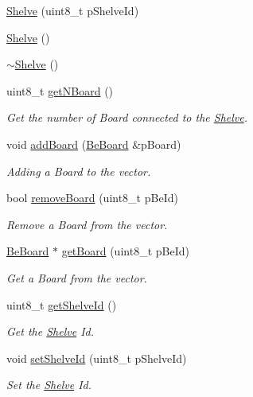 \begin{DoxyCompactItemize}
\item 
\hyperlink{class_ph2___hw_description_1_1_shelve_a7e0361665ca7e4de8ce3fd1138ad1d86}{Shelve} (uint8\-\_\-t p\-Shelve\-Id)
\item 
\hyperlink{class_ph2___hw_description_1_1_shelve_ab989c28364f9f94029dd02b3eb1d8241}{Shelve} ()
\item 
\hyperlink{class_ph2___hw_description_1_1_shelve_acbdc580d3ff8f4efe2df84d19ef6ef55}{$\sim$\-Shelve} ()
\item 
uint8\-\_\-t \hyperlink{class_ph2___hw_description_1_1_shelve_a9d8f1abe782fb206e11aae187cbc44c2}{get\-N\-Board} ()
\begin{DoxyCompactList}\small\item\em Get the number of Board connected to the \hyperlink{class_ph2___hw_description_1_1_shelve}{Shelve}. \end{DoxyCompactList}\item 
void \hyperlink{class_ph2___hw_description_1_1_shelve_aa6ab700f126822c6da156760f130aba6}{add\-Board} (\hyperlink{class_ph2___hw_description_1_1_be_board}{Be\-Board} \&p\-Board)
\begin{DoxyCompactList}\small\item\em Adding a Board to the vector. \end{DoxyCompactList}\item 
bool \hyperlink{class_ph2___hw_description_1_1_shelve_ad0d5bb55bdf8e6629cdc919685ffb8f9}{remove\-Board} (uint8\-\_\-t p\-Be\-Id)
\begin{DoxyCompactList}\small\item\em Remove a Board from the vector. \end{DoxyCompactList}\item 
\hyperlink{class_ph2___hw_description_1_1_be_board}{Be\-Board} $\ast$ \hyperlink{class_ph2___hw_description_1_1_shelve_a4b3d05cdf618b323e37fffdc3872476e}{get\-Board} (uint8\-\_\-t p\-Be\-Id)
\begin{DoxyCompactList}\small\item\em Get a Board from the vector. \end{DoxyCompactList}\item 
uint8\-\_\-t \hyperlink{class_ph2___hw_description_1_1_shelve_afaa80359d8619ba00d432004a928136e}{get\-Shelve\-Id} ()
\begin{DoxyCompactList}\small\item\em Get the \hyperlink{class_ph2___hw_description_1_1_shelve}{Shelve} Id. \end{DoxyCompactList}\item 
void \hyperlink{class_ph2___hw_description_1_1_shelve_a7f333a3851b7605ea7b5e87441eb6640}{set\-Shelve\-Id} (uint8\-\_\-t p\-Shelve\-Id)
\begin{DoxyCompactList}\small\item\em Set the \hyperlink{class_ph2___hw_description_1_1_shelve}{Shelve} Id. \end{DoxyCompactList}\end{DoxyCompactItemize}
